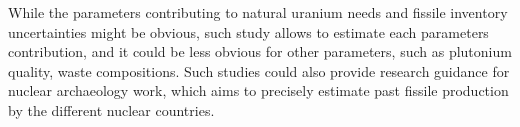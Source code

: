\documentclass{anstrans}
\begin{document}
While the parameters contributing to natural uranium needs and fissile inventory
uncertainties might be obvious, such study allows to estimate each parameters
contribution, and it could be less obvious for other parameters, such as
plutonium quality, waste compositions.  Such studies could also provide research
guidance for nuclear archaeology work, which aims to precisely estimate past
fissile production by the different nuclear countries.




\end{document}
